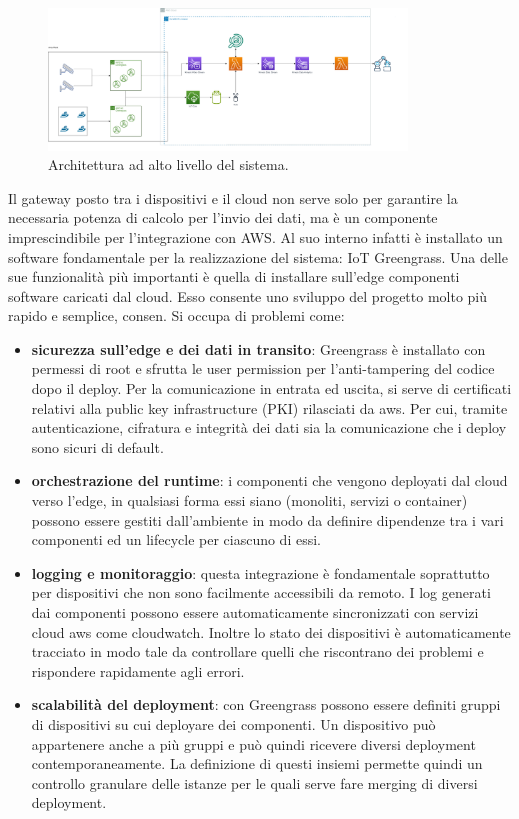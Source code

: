 \begin{figure}[htbp]
    \centering
    \includegraphics[width=0.85\textwidth]{figures/architettura.png}
    \caption{Architettura ad alto livello del sistema.} 
    \label{fig:architettura}
\end{figure}
 

Il gateway posto tra i dispositivi e il cloud non serve solo per garantire la necessaria potenza di calcolo per l’invio dei dati, ma è un componente imprescindibile per l’integrazione con AWS. Al suo interno infatti è installato un software fondamentale per la realizzazione del sistema: IoT Greengrass. Una delle sue funzionalità più importanti è quella di installare sull'edge componenti software caricati dal cloud. Esso consente uno sviluppo del progetto molto più rapido e semplice, consen. Si occupa di problemi come: 


\begin{itemize}
	\item \textbf{sicurezza sull’edge e dei dati in transito}: Greengrass è installato con permessi di root e sfrutta le user permission per l’anti-tampering del codice dopo il deploy. Per la comunicazione in entrata ed uscita, si serve di certificati relativi alla public key infrastructure (PKI) rilasciati da aws. Per cui, tramite autenticazione, cifratura e integrità dei dati sia la comunicazione che i deploy sono sicuri di default.
	\item \textbf{orchestrazione del runtime}: i componenti che vengono deployati dal cloud verso l’edge, in qualsiasi forma essi siano (monoliti, servizi o container) possono essere gestiti dall’ambiente in modo da definire dipendenze tra i vari componenti ed un lifecycle per ciascuno di essi.  
	\item \textbf{logging e monitoraggio}: questa integrazione è fondamentale soprattutto per dispositivi che non sono facilmente accessibili da remoto. I log generati dai componenti possono essere automaticamente sincronizzati con servizi cloud aws come cloudwatch. Inoltre lo stato dei dispositivi è automaticamente tracciato in modo tale da controllare quelli che riscontrano dei problemi e rispondere rapidamente agli errori.
	\item \textbf{scalabilità del deployment}: con Greengrass possono essere definiti gruppi di dispositivi su cui deployare dei componenti. Un dispositivo può appartenere anche a più gruppi e può quindi ricevere diversi deployment contemporaneamente. La definizione di questi insiemi permette quindi un controllo granulare delle istanze per le quali serve fare merging di diversi deployment.
\end{itemize}

